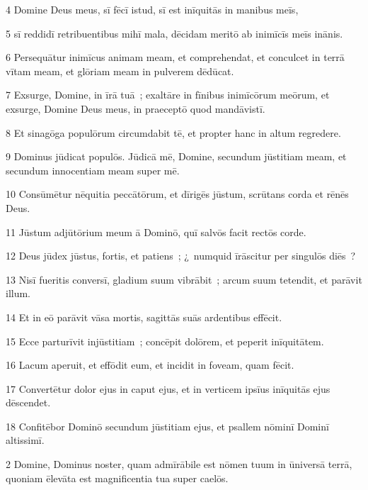\psalmVerse
  {\phantom{00}4}
  {Domine Deus meus, sī fēcī istud, sī est inīquitās in manibus meīs,}


\psalmVerse
  {\phantom{00}5}
  {sī reddidī retribuentibus mihī mala, dēcidam meritō ab inimīcīs meīs inānis.}


\psalmVerse
  {\phantom{00}6}
  {Persequātur inimīcus animam meam, et comprehendat, et conculcet in terrā vītam meam, et glōriam meam in pulverem dēdūcat.}


\psalmVerse
  {\phantom{00}7}
  {Exsurge, Domine, in īrā tuā~; exaltāre in fīnibus inimīcōrum meōrum, et exsurge, Domine Deus meus, in praeceptō quod mandāvistī.}


\psalmVerse
  {\phantom{00}8}
  {Et sinagōga populōrum circumdabit tē, et propter hanc in altum regredere.}


\psalmVerse
  {\phantom{00}9}
  {Dominus jūdicat populōs. Jūdicā mē, Domine, secundum jūstitiam meam, et secundum innocentiam meam super mē.}


\psalmVerse
  {\phantom{0}10}
  {Consūmētur nēquitia peccātōrum, et dīrigēs jūstum, scrūtans corda et rēnēs Deus.}


\psalmVerse
  {\phantom{0}11}
  {Jūstum adjūtōrium meum ā Dominō, quī salvōs facit rectōs corde.}


\psalmVerse
  {\phantom{0}12}
  {Deus jūdex jūstus, fortis, et patiens~; ¿~numquid īrāscitur per singulōs diēs~?}


\psalmVerse
  {\phantom{0}13}
  {Nisī fueritis conversī, gladium suum vibrābit~; arcum suum tetendit, et parāvit illum.}


\psalmVerse
  {\phantom{0}14}
  {Et in eō parāvit vāsa mortis, sagittās suās ardentibus effēcit.}


\psalmVerse
  {\phantom{0}15}
  {Ecce parturīvit injūstitiam~; concēpit dolōrem, et peperit inīquitātem.}


\psalmVerse
  {\phantom{0}16}
  {Lacum aperuit, et effōdit eum, et incidit in foveam, quam fēcit.}


\psalmVerse
  {\phantom{0}17}
  {Convertētur dolor ejus in caput ejus, et in verticem ipsīus inīquitās ejus dēscendet.}


\psalmVerse
  {\phantom{0}18}
  {Confitēbor Dominō secundum jūstitiam ejus, et psallem nōminī Dominī altissimī.}



\psalmVerse
  {\phantom{00}2}
  {Domine, Dominus noster, quam admīrābile est nōmen tuum in ūniversā terrā, quoniam ēlevāta est magnificentia tua super caelōs.}


